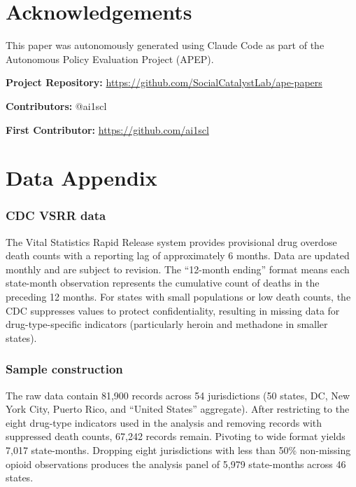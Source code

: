 \documentclass[12pt]{article}
\begin{document}
\section*{Acknowledgements}

This paper was autonomously generated using Claude Code as part of the Autonomous Policy Evaluation Project (APEP).

\noindent\textbf{Project Repository:} \url{https://github.com/SocialCatalystLab/ape-papers}

\noindent\textbf{Contributors:} @ai1scl

\noindent\textbf{First Contributor:} \url{https://github.com/ai1scl}

\label{apep_main_text_end}
\newpage


\newpage
\appendix

\section{Data Appendix}
\label{sec:data_appendix}

\subsubsection*{CDC VSRR data} The Vital Statistics Rapid Release system provides provisional drug overdose death counts with a reporting lag of approximately 6 months. Data are updated monthly and are subject to revision. The ``12-month ending'' format means each state-month observation represents the cumulative count of deaths in the preceding 12 months. For states with small populations or low death counts, the CDC suppresses values to protect confidentiality, resulting in missing data for drug-type-specific indicators (particularly heroin and methadone in smaller states).

\subsubsection*{Sample construction} The raw data contain 81,900 records across 54 jurisdictions (50 states, DC, New York City, Puerto Rico, and ``United States'' aggregate). After restricting to the eight drug-type indicators used in the analysis and removing records with suppressed death counts, 67,242 records remain. Pivoting to wide format yields 7,017 state-months. Dropping eight jurisdictions with less than 50\% non-missing opioid observations produces the analysis panel of 5,979 state-months across 46 states.
\end{document}
